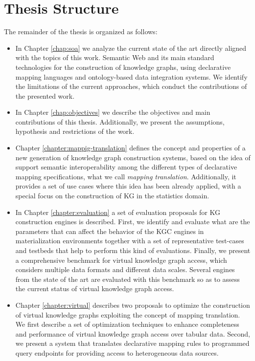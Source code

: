 \section{Thesis Structure}
\label{sec:thesisstructure}
The remainder of the thesis is organized as follows:
\begin{itemize}
    \item In Chapter \ref{chap:soa} we analyze the current state of the art directly aligned with the topics of this work. Semantic Web and its main standard technologies for the construction of knowledge graphs, using declarative mapping languages and ontology-based data integration systems. We identify the limitations of the current approaches, which conduct the contributions of the presented work.
    \item In Chapter \ref{chap:objectives} we describe the objectives and main contributions of this thesis. Additionally, we present the assumptions, hypothesis and restrictions of the work.
    \item Chapter \ref{chapter:mappig-translation} defines the concept and properties of a new generation of knowledge graph construction systems, based on the idea of support semantic interoperability among the different types of declarative mapping specifications, what we call \textit{mapping translation}. Additionally, it provides a set of use cases where this idea has been already applied, with a special focus on the construction of KG in the statistics domain.
    \item In Chapter \ref{chapter:evaluation} a set of evaluation proposals for KG construction engines is described. First, we identify and evaluate what are the parameters that can affect the behavior of the KGC engines in materialization environments together with a set of representative test-cases and testbeds that help to perform this kind of evaluations. Finally, we present a comprehensive benchmark for virtual knowledge graph access, which considers multiple data formats and different data scales. Several engines from the state of the art are evaluated with this benchmark so as to assess the current status of virtual knowledge graph access. 
    \item Chapter \ref{chapter:virtual} describes two proposals to optimize the construction of virtual knowledge graphs exploiting the concept of mapping translation. We first describe a set of optimization techniques to enhance completeness and performance of virtual knowledge graph access over tabular data. Second, we present a system that translates declarative mapping rules to programmed query endpoints for providing access to heterogeneous data sources.

\end{itemize}
